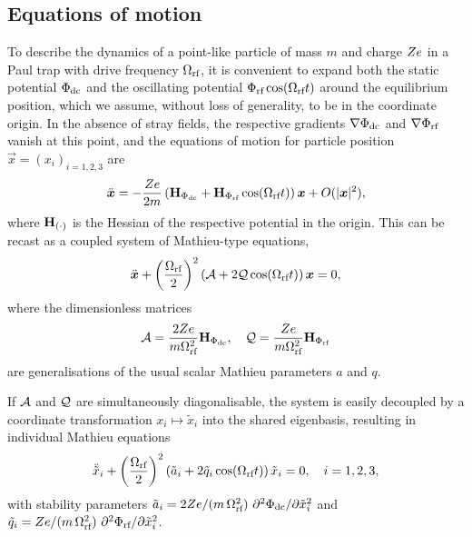 \documentclass[pra,twocolumn]{revtex4-2}
\begin{document}
\subsection{Equations of motion}

To describe the dynamics of a point-like particle of mass $m$ and charge $Z e$ in a Paul trap with drive frequency $\Omega_{\textrm{rf}}$, it is convenient to expand both the static potential $\Phi_{\textrm{dc}}$ and the oscillating potential $\Phi_{\textrm{rf}} \cos(\Omega_{\textrm{rf}} t)$ around the equilibrium position, which we assume, without loss of generality, to be in the coordinate origin. In the absence of stray fields, the respective gradients $\nabla \Phi_{\textrm{dc}}$ and $\nabla \Phi_{\textrm{rf}}$ vanish at this point, and the equations of motion for particle position $\vec{x} = (x_i)_{i = 1, 2, 3}$ are
\begin{equation}
	\ddot{\boldsymbol{x}} = -\frac{Z e}{2 m} \left(\mathbf{H}_{\Phi_{\textrm{dc}}} + \mathbf{H}_{\Phi_{\textrm{rf}}} \cos(\Omega_{\textrm{rf}} t) \right) \boldsymbol{x} + O(|\boldsymbol{x}|^2),
\end{equation}
where $\mathbf{H}_{(\cdot)}$ is the Hessian of the respective potential in the origin.
This can be recast as a coupled system of Mathieu-type equations,
\begin{equation}
	\ddot{\boldsymbol{x}} + \left(\frac{\Omega_{\textrm{rf}}}{2}\right)^2 \left(\mathcal{A} + 2 \mathcal{Q} \cos(\Omega_{\textrm{rf}} t)\right) \boldsymbol{x} = 0,
	\label{eq:matrix-mathieu}
\end{equation}
where the dimensionless matrices
\begin{equation}
	\mathcal{A} = \frac{2 Z e}{m \Omega_{\textrm{rf}}^2} \mathbf{H}_{\Phi_{\textrm{dc}}}, \quad
	\mathcal{Q} = \frac{Z e}{m \Omega_{\textrm{rf}}^2} \mathbf{H}_{\Phi_{\textrm{rf}}}
\end{equation}
are generalisations of the usual scalar Mathieu parameters $a$ and $q$.

If $\mathcal{A}$ and $\mathcal{Q}$ are simultaneously diagonalisable, the system is easily decoupled by a coordinate transformation $x_i \mapsto \tilde{x}_i$ into the shared eigenbasis, resulting in individual Mathieu equations
\begin{equation}
	\ddot{\tilde{x}}_i + \left(\frac{\Omega_{\textrm{rf}}}{2}\right)^2 \left(\tilde{a}_i + 2 \tilde{q}_i \cos(\Omega_{\textrm{rf}} t)\right) \tilde{x}_i = 0,\quad  i = 1, 2, 3,
	\label{eq:decoupled-mathieu}
\end{equation}
with stability parameters $\tilde{a}_i = 2 \charge / (m\, \wRF^2)\ \partial^2\dcpot/\partial\tilde{x}_i^2$ and $\tilde{q}_i = \charge / (m\, \wRF^2)\ \partial^2\rfpot/\partial\tilde{x}_i^2$.
\end{document}
